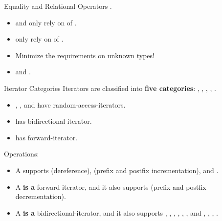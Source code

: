 \begin{frame}{Equality and Relational Operators}
    \ttt{==, !=, <, <=, >, >=}.
    \begin{itemize}
        \item \ttt{==} and \ttt{!=} only rely on  of .
        \item \ttt{<, <=, >, >=} only rely on  of .
        \item Minimize the requirements on unknown types!
        \pause
        \item {} and .
    \end{itemize}
\end{frame}

\begin{frame}{Iterator Categories}
    Iterators are classified into \textbf{five categories}: , , , , .
    \begin{itemize}
        \item {}, ,  and  have random-access-iterators.
        \item {} has bidirectional-iterator.
        \item {} has forward-iterator.
    \end{itemize}
    \pause
    Operations:
    \begin{itemize}
        \item A  supports  (dereference),  (prefix and postfix incrementation),  and .
        \item A  \textbf{is a} forward-iterator, and it also supports  (prefix and postfix decrementation).
        \item A  \textbf{is a} bidirectional-iterator, and it also supports , , , , \ttt{+=}, \ttt{-=},  and \ttt{<}, \ttt{<=}, \ttt{>}, \ttt{>=}.
    \end{itemize}
\end{frame}

